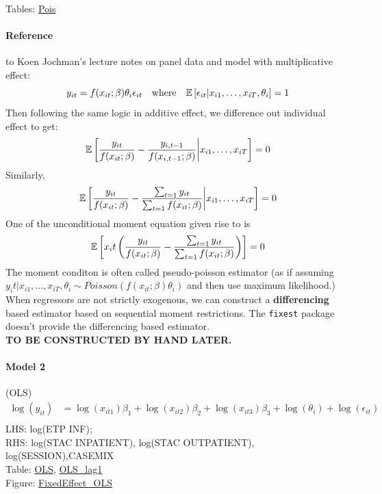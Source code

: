 Tables: \hyperlink{reg_inf_pois_2022}{Pois}

\paragraph{Reference} to Koen Jochman's lecture notes on panel data and model with multiplicative
effect:
\begin{equation*}
    y_{it}=f(x_{it};\beta)\theta_i\epsilon_{it} \quad \text{where} \quad \mathbb{E}\left[\epsilon_{it}|x_{i1},\ldots,x_{iT},\theta_i\right]=1
\end{equation*}
Then following the same logic in additive effect, we difference out individual effect to get:
\begin{equation*}
    \mathbb{E}\left[\frac{y_{it}}{f(x_{it};\beta)}-\frac{y_{i,t-1}}{f(x_{i,t-1};\beta)}\bigg | x_{i1},\ldots,x_{iT}\right]=0
\end{equation*}
Similarly, \begin{equation*}
    \mathbb{E}\left[\frac{y_{it}}{f(x_{it};\beta)}-\frac{\sum_{t=1}y_{it}}{\sum_{t=1}f(x_{it};\beta)}\bigg | x_{i1},\ldots,x_{iT}\right]=0
\end{equation*}
One of the unconditional moment equation given rise to is \begin{equation}
    \mathbb{E}\left[x_it\left(\frac{y_{it}}{f(x_{it};\beta)}-\frac{\sum_{t=1}y_{it}}{\sum_{t=1}f(x_{it};\beta)}\right)\right]=0
\end{equation}
The moment conditon is often called pseudo-poisson estimator (as if assuming $y_it|x_{i1},\ldots,x_{iT},\theta_i\sim Poisson(f(x_{it};\beta)\theta_i)$ and then use maximum likelihood.)
When regressors are not strictly exogenous, we can construct a \textbf{differencing} based estimator based on sequential moment restrictions.
The \verb+fixest+ package doesn't provide the differencing based estimator. \\
\textbf{TO BE CONSTRUCTED BY HAND LATER.}
\paragraph{Model 2} (OLS)
\begin{align*}
    \log(y_{it}) & =\log(x_{it1})\beta_1+\log(x_{it2})\beta_2+\log(x_{it3})\beta_3+\log(\theta_i)+\log(\epsilon_{it}) \\
\end{align*}
LHS: log(ETP INF); \\ RHS: log(STAC INPATIENT), log(STAC OUTPATIENT),
log(SESSION),CASEMIX
\\Table: \hyperlink{reg_inf_ols_2022}{OLS},
\hyperlink{reg_inf_lag_2022}{OLS\_lag1}
\\Figure: \hyperlink{FE_OLS_FI}{FixedEffect\_OLS}

